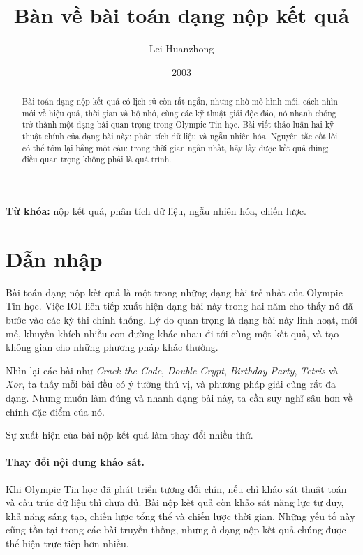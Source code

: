 \documentclass[11pt]{article}
\title{Bàn về bài toán dạng nộp kết quả}
\author{Lei Huanzhong}
\date{2003}
\begin{document}
\maketitle


\begin{abstract}
Bài toán dạng nộp kết quả có lịch sử còn rất ngắn, nhưng nhờ mô hình mới,
cách nhìn mới về hiệu quả, thời gian và bộ nhớ, cùng các kỹ thuật giải độc
đáo, nó nhanh chóng trở thành một dạng bài quan trọng trong Olympic Tin học.
Bài viết thảo luận hai kỹ thuật chính của dạng bài này: phân tích dữ liệu và
ngẫu nhiên hóa. Nguyên tắc cốt lõi có thể tóm lại bằng một câu: trong thời
gian ngắn nhất, hãy lấy được kết quả đúng; điều quan trọng không phải là quá
trình.
\end{abstract}

\noindent\textbf{Từ khóa:} nộp kết quả, phân tích dữ liệu, ngẫu nhiên hóa,
chiến lược.

\section{Dẫn nhập}

Bài toán dạng nộp kết quả là một trong những dạng bài trẻ nhất của Olympic
Tin học. Việc IOI liên tiếp xuất hiện dạng bài này trong hai năm cho thấy nó
đã bước vào các kỳ thi chính thống. Lý do quan trọng là dạng bài này linh
hoạt, mới mẻ, khuyến khích nhiều con đường khác nhau đi tới cùng một kết quả,
và tạo không gian cho những phương pháp khác thường.

Nhìn lại các bài như \textit{Crack the Code}, \textit{Double Crypt},
\textit{Birthday Party}, \textit{Tetris} và \textit{Xor}, ta thấy mỗi bài đều
có ý tưởng thú vị, và phương pháp giải cũng rất đa dạng. Nhưng muốn làm đúng
và nhanh dạng bài này, ta cần suy nghĩ sâu hơn về chính đặc điểm của nó.

Sự xuất hiện của bài nộp kết quả làm thay đổi nhiều thứ.

\paragraph{Thay đổi nội dung khảo sát.}
Khi Olympic Tin học đã phát triển tương đối chín, nếu chỉ khảo sát thuật toán
và cấu trúc dữ liệu thì chưa đủ. Bài nộp kết quả còn khảo sát năng lực tư duy,
khả năng sáng tạo, chiến lược tổng thể và chiến lược thời gian. Những yếu tố
này cũng tồn tại trong các bài truyền thống, nhưng ở dạng nộp kết quả chúng
được thể hiện trực tiếp hơn nhiều.
\end{document}
